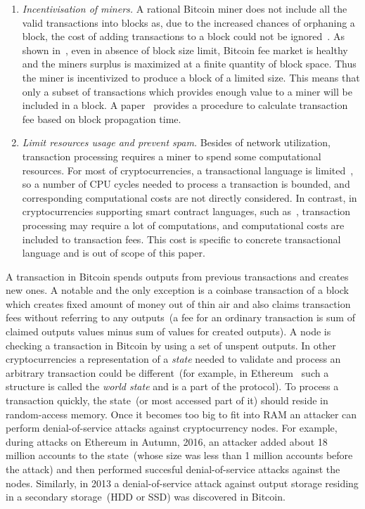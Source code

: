 \documentclass[]{llncs}   %
\begin{document}
\begin{enumerate}
  \item{\em Incentivisation of miners.} A rational Bitcoin miner does not include all the valid transactions into blocks as, due to the increased chances of orphaning a block, the cost of adding transactions to a block could not be ignored~\cite{andersen2013,rizun2015transaction}. As shown in~\cite{rizun2015transaction}, even in absence of block size limit, Bitcoin fee market is healthy and the miners surplus is maximized at a finite quantity of block space. Thus the miner is incentivized to produce a block of a limited size. This means that only a subset of transactions which provides enough value to a miner will be included in a block. A paper~\cite{rizun2015transaction} provides a procedure to calculate transaction fee based on block propagation time.

  \item{\em Limit resources usage and prevent spam. } Besides of network utilization, transaction processing requires a miner to spend some computational resources. For most of cryptocurrencies, a transactional language is limited~\cite{script}, so a number of CPU cycles needed to process a transaction is bounded, and corresponding computational costs are not directly considered. In contrast, in cryptocurrencies supporting  smart contract languages, such as~\cite{seijas2016scripting,tezosScript,solidity}, transaction processing may require a lot of computations, and computational costs are included to transaction fees. This cost is specific to concrete transactional language and is out of scope of this paper.
\end{enumerate}

A transaction in Bitcoin spends outputs from previous transactions and creates new ones. A notable and the only exception is a coinbase transaction of a block which creates fixed amount of money out of thin air and also claims transaction fees without referring to any outputs~(a fee for an ordinary transaction is sum of claimed outputs values minus sum of values for created outputs). A node is checking a transaction in Bitcoin by using a set of unspent outputs. In other cryptocurrencies a representation of a \textit{state} needed to validate and process an arbitrary transaction could be different~(for example, in Ethereum~\cite{ethyp} such a structure is called the \textit{world state} and is a part of the protocol). To process a transaction quickly, the state~(or most accessed part of it) should reside in random-access memory. Once it becomes too big to fit into RAM an attacker can perform denial-of-service attacks against cryptocurrency nodes. For example, during attacks on Ethereum in Autumn, 2016, an attacker added about 18 million accounts to the state~(whose size was less than 1 million accounts before the attack) and then performed succesful denial-of-service attacks against the nodes\cite{eth2016dos,atzei2017survey}. Similarly, in 2013 a denial-of-service attack against output storage residing in a secondary storage~(HDD or SSD) was discovered in Bitcoin\cite{vasek2014empirical}.
\end{document}
